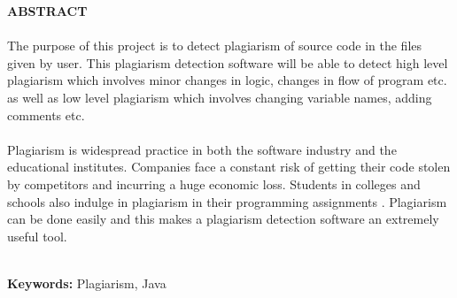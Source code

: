 \begin{center}
\thispagestyle{empty}
\vspace{2cm}
\LARGE{\textbf{ABSTRACT}}\\[1.0cm]
\end{center}
\thispagestyle{empty}
\large{\paragraph{}The purpose of this project is to detect plagiarism of source code in the files given by user. This plagiarism detection software will be able to detect high level plagiarism which involves minor changes in logic, changes in flow of program etc. as well as low level plagiarism which involves changing variable names, adding comments etc.
}


\large{\paragraph{}Plagiarism is widespread practice in both the software industry and the educational institutes. Companies face a constant risk of getting their code stolen by competitors and incurring a huge economic loss. Students in colleges and schools also indulge in plagiarism in their programming assignments . Plagiarism can be done easily and this makes a plagiarism detection software an extremely useful tool.}\\
\textbf{Keywords: }Plagiarism, Java